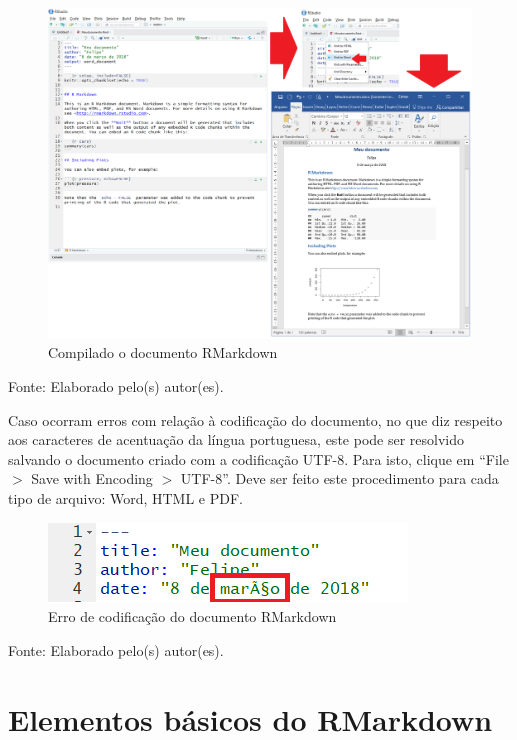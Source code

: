 \documentclass[12pt,portuguese,oneside]{book}
\begin{document}
\begin{figure}[H]

{\centering \includegraphics[width=0.8\linewidth]{compilar} 

}

\caption{Compilado o documento RMarkdown}\label{fig:compil}
\end{figure}

Fonte: Elaborado pelo(s) autor(es).

Caso ocorram erros com relação à codificação do documento, no que diz
respeito aos caracteres de acentuação da língua portuguesa, este pode
ser resolvido salvando o documento criado com a codificação UTF-8. Para
isto, clique em ``File \(>\) Save with Encoding \(>\) UTF-8''. Deve ser
feito este procedimento para cada tipo de arquivo: Word, HTML e PDF.

\begin{figure}[H]

{\centering \includegraphics[width=0.8\linewidth]{errocodif} 

}

\caption{Erro de codificação do documento RMarkdown}\label{fig:errocodif}
\end{figure}

Fonte: Elaborado pelo(s) autor(es).

\section{Elementos básicos do
RMarkdown}\label{elementos-basicos-do-rmarkdown}
\end{document}
